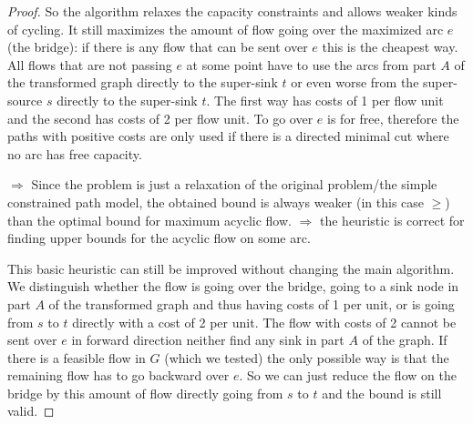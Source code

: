\begin{proof}
So the algorithm relaxes the capacity constraints and allows weaker kinds of cycling. It still maximizes the amount of 
flow going over the maximized arc $e$ (the bridge): if there is any flow that can be sent over $e$ this is the cheapest 
way. All flows that are not passing $e$ at some point have to use the arcs from part $A$ of the transformed graph 
directly to the super-sink $t$ or even worse from the super-source $s$ directly to the super-sink $t$. The first way 
has costs of 1 per flow unit and the second has costs of 2 per flow unit. To go over $e$ is for free, therefore the 
paths with positive costs are only used if there is a directed minimal cut where no arc has free capacity.


$\Rightarrow$ Since the problem is just a relaxation of the original problem/the simple constrained path model, the 
obtained bound is always weaker (in this case $\ge$) than the optimal bound for maximum acyclic flow. 
$\Rightarrow$ the heuristic is correct for finding upper bounds for the acyclic flow on some arc.


This basic heuristic can still be improved without changing the main algorithm. We distinguish whether the flow is 
going over the bridge, going to a sink node in part $A$ of the transformed graph and thus having costs of 1 per unit, 
or is going from $s$ to $t$ directly with a cost of 2 per unit. The flow with costs of 2 cannot be sent over $e$ in 
forward direction neither find any sink in part $A$ of the graph. If there is a feasible flow in $G$ (which we tested) 
the only possible way is that the remaining flow has to go backward over $e$. So we can just reduce the flow on the 
bridge by this amount of flow directly going from $s$ to $t$ and the bound is still valid.
\end{proof}


